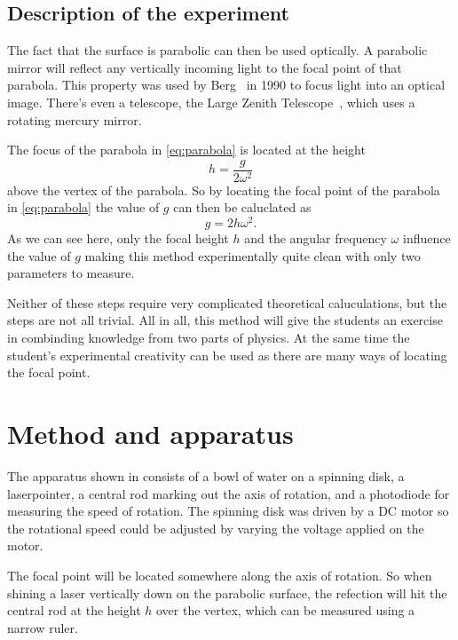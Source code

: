 \documentclass[11pt,towcolumn, swedish, english]{article}
\begin{document}
\subsection{Description of the experiment }
The fact that the surface is parabolic can then be used optically. A
parabolic mirror will reflect any vertically incoming light to the
focal point of that parabola. This property was used by
Berg~\cite{Berg1990} in 1990 to focus light into an optical
image. There's even a telescope, the Large Zenith
Telescope~\cite{LargeZenith}, which uses a rotating mercury mirror. 

The focus of the parabola in \eqref{eq:parabola} is located at the
height~\cite{Physics_Handbook} 
\begin{equation}
h=\frac{g}{2\omega^2}
\end{equation}
above the vertex of the parabola. So by locating the focal point of
the parabola in \eqref{eq:parabola} the value of $g$ can then be
caluclated as 
\begin{equation}
g=2h\omega^2.
\end{equation}
As we can see here, only the focal height $h$ and the angular
frequency $\omega$ influence the value of $g$ making this method
experimentally quite clean with only two parameters to measure. 

Neither of these steps require very complicated theoretical caluculations, but
the steps are not all trivial. All in all, this method will
give the students an exercise in combinding knowledge from two parts
of physics. At the same time the student's experimental creativity can
be used as there are many ways of locating the focal point. 




\section{Method and apparatus}
The apparatus shown in  consists of a bowl of water
on a spinning disk, a laserpointer, a central rod marking out the axis of
rotation, and a photodiode for measuring the speed of rotation. The spinning
disk was driven by a DC motor so the rotational speed could be
adjusted by varying the voltage applied on the motor. 

The focal point will be located somewhere along the axis of rotation. So when
shining a laser vertically down on the parabolic surface, the refection will hit
the central rod at the height $h$ over the vertex, which can be measured
using a narrow ruler. 
\end{document}
